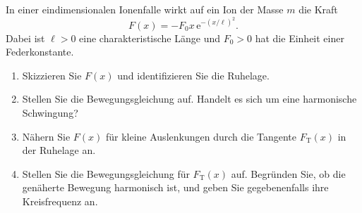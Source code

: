 \begin{ExerciseBlock}
In einer eindimensionalen Ionenfalle wirkt auf ein Ion der Masse $m$ die Kraft
\[
 F(x)=-F_0 x\,\mathrm e^{-(x/\ell)^2}.
\]
Dabei ist $\ell>0$ eine charakteristische Länge und $F_0>0$ hat die Einheit einer Federkonstante.
\begin{enumerate}
\item Skizzieren Sie $F(x)$ und identifizieren Sie die Ruhelage.
\item Stellen Sie die Bewegungsgleichung auf. Handelt es sich um eine harmonische Schwingung?
\item Nähern Sie $F(x)$ für kleine Auslenkungen durch die Tangente $F_\mathrm T(x)$ in der Ruhelage an.
\item Stellen Sie die Bewegungsgleichung für $F_\mathrm T(x)$ auf. Begründen Sie, ob die genäherte Bewegung harmonisch ist, und geben Sie gegebenenfalls ihre Kreisfrequenz an.
\end{enumerate}
\end{ExerciseBlock}
